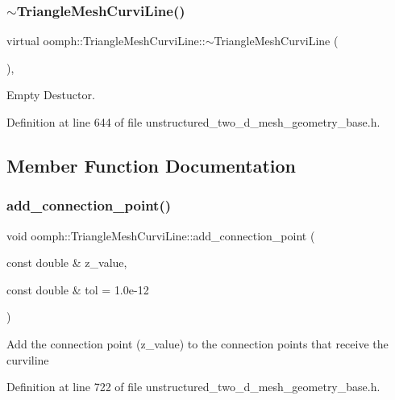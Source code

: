 \subsubsection{\texorpdfstring{$\sim$\+Triangle\+Mesh\+Curvi\+Line()}{~TriangleMeshCurviLine()}}
{\footnotesize\ttfamily virtual oomph\+::\+Triangle\+Mesh\+Curvi\+Line\+::$\sim$\+Triangle\+Mesh\+Curvi\+Line (\begin{DoxyParamCaption}{ }\end{DoxyParamCaption})\hspace{0.3cm}{\ttfamily [inline]}, {\ttfamily [virtual]}}



Empty Destuctor. 



Definition at line 644 of file unstructured\+\_\+two\+\_\+d\+\_\+mesh\+\_\+geometry\+\_\+base.\+h.



\subsection{Member Function Documentation}
\mbox{\label{classoomph_1_1TriangleMeshCurviLine_a3605aa21fbdec5f73b1baf842fdb4611}} 
\subsubsection{\texorpdfstring{add\+\_\+connection\+\_\+point()}{add\_connection\_point()}}
{\footnotesize\ttfamily void oomph\+::\+Triangle\+Mesh\+Curvi\+Line\+::add\+\_\+connection\+\_\+point (\begin{DoxyParamCaption}\item[{const double \&}]{z\+\_\+value,  }\item[{const double \&}]{tol = {\ttfamily 1.0e-\/12} }\end{DoxyParamCaption})\hspace{0.3cm}{\ttfamily [inline]}}

Add the connection point (z\+\_\+value) to the connection points that receive the curviline 

Definition at line 722 of file unstructured\+\_\+two\+\_\+d\+\_\+mesh\+\_\+geometry\+\_\+base.\+h.



